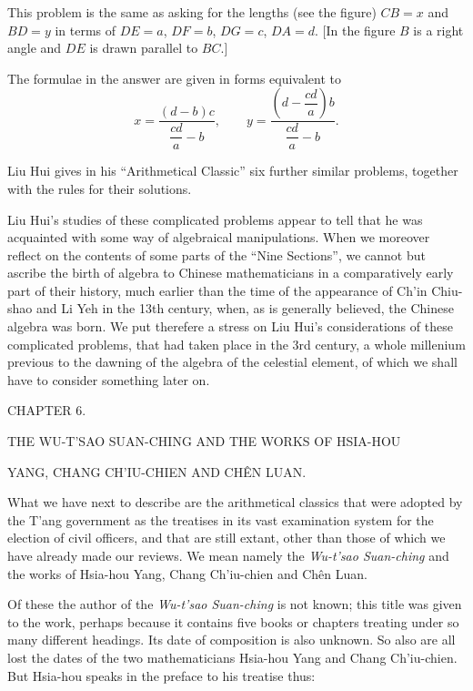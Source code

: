 \documentclass[11pt]{article}
\newcommand{\scanpage}[2]{\clearpage\setcounter{footnote}{0}\noindent{\footnotesize\color{gray}PDF page #1 · #2}\par\medskip}
\newcommand{\scanfooter}{}
\begin{document}
This problem is the same as asking for the lengths (see the figure) $CB=x$ and $BD=y$ in terms of $DE=a$, $DF=b$, $DG=c$, $DA=d$. [In the figure $B$ is a right angle and $DE$ is drawn parallel to $BC$.]

The formulae in the answer are given in forms equivalent to
\[
x=\frac{(d-b)c}{\dfrac{cd}{a}-b},\qquad
 y=\frac{\left(d-\dfrac{cd}{a}\right)b}{\dfrac{cd}{a}-b}.
\]

Liu Hui gives in his ``Arithmetical Classic'' six further similar problems, together with the rules for their solutions.

Liu Hui's studies of these complicated problems appear to tell that he was acquainted with some way of algebraical manipulations. When we moreover reflect on the contents of some parts of the ``Nine Sections'', we cannot but ascribe the birth of algebra to Chinese mathematicians in a comparatively early part of their history, much earlier than the time of the appearance of Ch'in Chiu-shao and Li Yeh in the 13th century, when, as is generally believed, the Chinese algebra was born. We put therefere a stress on Liu Hui's considerations of these complicated problems, that had taken place in the 3rd century, a whole millenium previous to the dawning of the algebra of the celestial element, of which we shall have to consider something later on.
\scanfooter

\scanpage{0051}{Chapter 6, printed page 37}
\begin{center}
CHAPTER 6.\par
\medskip
THE WU-T'SAO SUAN-CHING AND THE WORKS OF HSIA-HOU\par
YANG, CHANG CH'IU-CHIEN AND CHÊN LUAN.
\end{center}

What we have next to describe are the arithmetical classics that were adopted by the T'ang government as the treatises in its vast examination system for the election of civil officers, and that are still extant, other than those of which we have already made our reviews. We mean namely the \emph{Wu-t'sao Suan-ching} and the works of Hsia-hou Yang, Chang Ch'iu-chien and Chên Luan.

Of these the author of the \emph{Wu-t'sao Suan-ching} is not known; this title was given to the work, perhaps because it contains five books or chapters treating under so many different headings. Its date of composition is also unknown. So also are all lost the dates of the two mathematicians Hsia-hou Yang and Chang Ch'iu-chien. But Hsia-hou speaks in the preface to his treatise thus:
\end{document}
